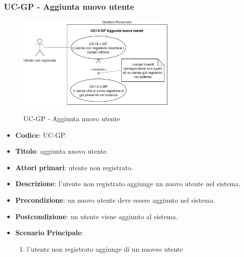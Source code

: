 \subsubsection{UC\theuccount-GP - Aggiunta nuovo utente}
		\begin{figure}[H]
			\centering
				\includegraphics[width=0.7\textwidth]{img/casi_d'uso/UC15.png}\\
			\caption{UC\theuccount-GP - Aggiunta nuovo utente}
		\end{figure}
	\begin{itemize}
		\item \textbf{Codice}: UC\theuccount-GP.
		\item \textbf{Titolo}: aggiunta nuovo utente.
		\item \textbf{Attori primari}: utente non registrato.
		\item \textbf{Descrizione}: l'utente non registrato aggiunge un nuovo utente nel sistema.
		\item \textbf{Precondizione}: un nuovo utente deve essere aggiunto nel sistema.
		\item \textbf{Postcondizione}: un utente viene aggiunto al sistema.
		\item \textbf{Scenario Principale}:
		\begin{enumerate}
			\item l'utente non registrato aggiunge di un nuovso utente
		\end{enumerate}
	\end{itemize}
	
